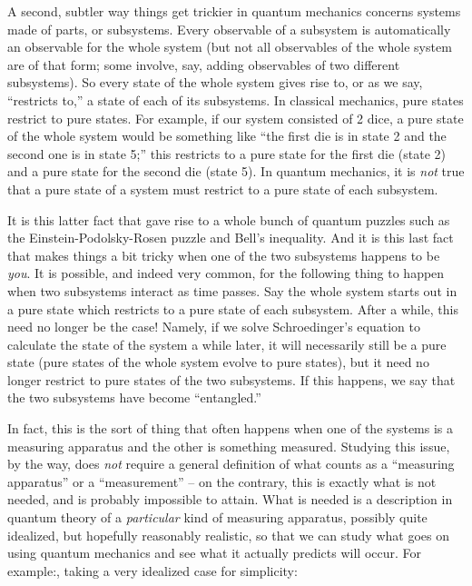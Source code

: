 \documentclass{article}
\begin{document}
A second, subtler way things get trickier in quantum mechanics concerns
systems made of parts, or subsystems. Every observable of a subsystem is
automatically an observable for the whole system (but not all
observables of the whole system are of that form; some involve, say,
adding observables of two different subsystems). So every state of the
whole system gives rise to, or as we say, ``restricts to,'' a state of
each of its subsystems. In classical mechanics, pure states restrict to
pure states. For example, if our system consisted of 2 dice, a pure
state of the whole system would be something like ``the first die is in
state 2 and the second one is in state 5;'' this restricts to a pure
state for the first die (state 2) and a pure state for the second die
(state 5). In quantum mechanics, it is \emph{not} true that a pure state
of a system must restrict to a pure state of each subsystem.

It is this latter fact that gave rise to a whole bunch of quantum
puzzles such as the Einstein-Podolsky-Rosen puzzle and Bell's
inequality. And it is this last fact that makes things a bit tricky when
one of the two subsystems happens to be \emph{you}. It is possible, and
indeed very common, for the following thing to happen when two
subsystems interact as time passes. Say the whole system starts out in a
pure state which restricts to a pure state of each subsystem. After a
while, this need no longer be the case! Namely, if we solve
Schroedinger's equation to calculate the state of the system a while
later, it will necessarily still be a pure state (pure states of the
whole system evolve to pure states), but it need no longer restrict to
pure states of the two subsystems. If this happens, we say that the two
subsystems have become ``entangled.''

In fact, this is the sort of thing that often happens when one of the
systems is a measuring apparatus and the other is something measured.
Studying this issue, by the way, does \emph{not} require a general
definition of what counts as a ``measuring apparatus'' or a
``measurement'' -- on the contrary, this is exactly what is not needed,
and is probably impossible to attain. What is needed is a description in
quantum theory of a \emph{particular} kind of measuring apparatus,
possibly quite idealized, but hopefully reasonably realistic, so that we
can study what goes on using quantum mechanics and see what it actually
predicts will occur. For example:, taking a very idealized case for
simplicity:
\end{document}

